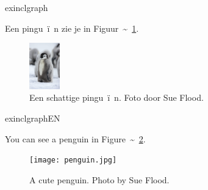 

\begin{saveblock}{exinclgraph}
    \begin{highlightblock}[linewidth=0.95\textwidth,framexleftmargin=0.25em]
        Een pingu~\"i~n zie je in Figuur~\textasciitilde~\ref{fig:pinguin}.
        \begin{figure}[h]
            \centering
            \includegraphics[height=2cm]{pinguin.jpg}
            \caption{Een schattige pingu~\"i~n. Foto door
            Sue Flood.}\label{fig:pinguin}
        \end{figure}
    \end{highlightblock}
\end{saveblock}

\begin{saveblock}{exinclgraphEN}
    \begin{highlightblock}[linewidth=0.95\textwidth,framexleftmargin=0.25em]
        You can see a penguin in Figure~\textasciitilde~\ref{fig:penguin}.
        \begin{figure}[h]
            \centering
            \texttt{[image: penguin.jpg]}
            \caption{A cute penguin. Photo by Sue Flood.}
            \label{fig:penguin}
        \end{figure}
    \end{highlightblock}
\end{saveblock}

